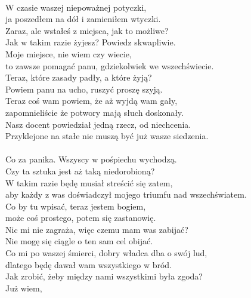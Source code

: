 \\

\chardoc{}
W czasie waszej niepoważnej potyczki,\\
ja poszedłem na dół i zamieniłem wtyczki.\\

\charszam{}
Zaraz, ale wstałeś z miejsca, jak to możliwe?\\
Jak w takim razie żyjesz? Powiedz skwapliwie.\\

\chardoc{}
Moje miejsce, nie wiem czy wiecie,\\
to zawsze pomagać panu, gdziekolwiek we wszechświecie.\\
Teraz, które zasady padły, a które żyją?\\
Powiem panu na ucho, ruszyć proszę szyją.\\

\charfer{}
Teraz coś wam powiem, że aż wyjdą wam gały,\\
zapomnieliście że potwory mają słuch doskonały.\\
Nasz docent powiedział jedną rzecz, od niechcenia.\\
Przyklejone na stałe nie muszą być już wasze siedzenia.\\

\\

\charszam{}
Co za panika. Wszyscy w pośpiechu wychodzą.\\
Czy ta sztuka jest aż taką niedorobioną?\\
W takim razie będę musiał streścić się zatem,\\
aby każdy z was doświadczył mojego triumfu nad wszechświatem.\\
Co by tu wpisać, teraz jestem bogiem,\\
może coś prostego, potem się zastanowię.\\
Nic mi nie zagraża, więc czemu mam was zabijać?\\
Nie mogę się ciągle o ten sam cel obijać.\\
Co mi po waszej śmierci, dobry władca dba o swój lud,\\
dlatego będę dawał wam wszystkiego w bród.\\
Jak zrobić, żeby między nami wszystkimi była zgoda?\\
Już wiem, \\











